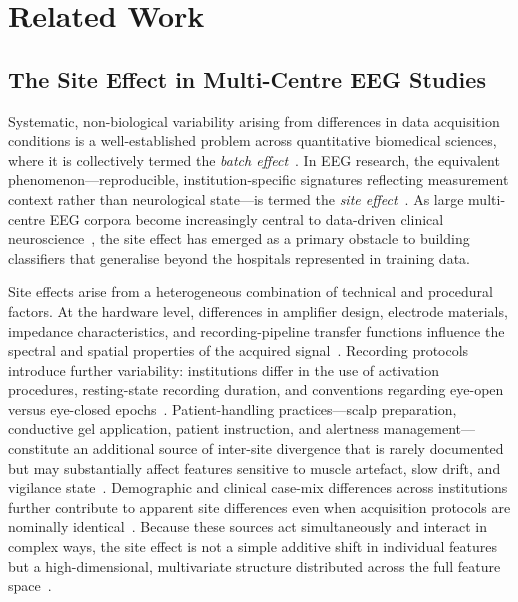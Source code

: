 \documentclass[preprint,12pt]{elsarticle}
\begin{document}
\section{Related Work}
\label{sec:related}

\subsection{The Site Effect in Multi-Centre EEG Studies}
\label{subsec:site_effect}

Systematic, non-biological variability arising from differences in
data acquisition conditions is a well-established problem across
quantitative biomedical sciences, where it is collectively termed the
\emph{batch effect}~\cite{johnson2007adjusting}.
In EEG research, the equivalent phenomenon---reproducible,
institution-specific signatures reflecting measurement context rather
than neurological state---is termed the \emph{site
effect}~\cite{li2022harmnqeeg}.
As large multi-centre EEG corpora become increasingly central to
data-driven clinical neuroscience~\cite{dong2025normative,
mushtaq2025eeg}, the site effect has emerged as a primary obstacle to
building classifiers that generalise beyond the hospitals represented
in training data.

Site effects arise from a heterogeneous combination of technical and
procedural factors.
At the hardware level, differences in amplifier design, electrode
materials, impedance characteristics, and recording-pipeline transfer
functions influence the spectral and spatial properties of the
acquired signal~\cite{li2022harmnqeeg}.
Recording protocols introduce further variability: institutions differ
in the use of activation procedures, resting-state recording duration,
and conventions regarding eye-open versus eye-closed
epochs~\cite{jaramillo2024combat}.
Patient-handling practices---scalp preparation, conductive gel
application, patient instruction, and alertness
management---constitute an additional source of inter-site divergence
that is rarely documented but may substantially affect features
sensitive to muscle artefact, slow drift, and vigilance
state~\cite{jaramillo2024combat,mushtaq2025eeg}.
Demographic and clinical case-mix differences across institutions
further contribute to apparent site differences even when acquisition
protocols are nominally identical~\cite{dong2025normative}.
Because these sources act simultaneously and interact in complex ways,
the site effect is not a simple additive shift in individual features
but a high-dimensional, multivariate structure distributed across the
full feature space~\cite{mellot2023meeg}.
\end{document}
